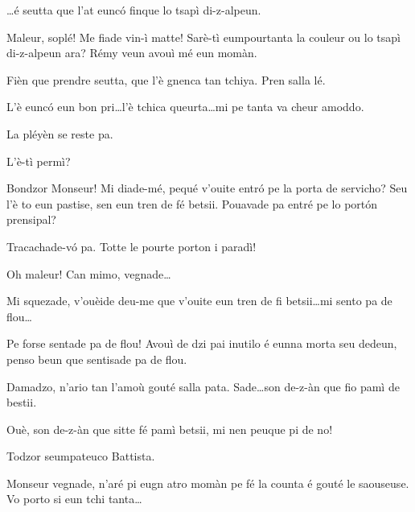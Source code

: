 \begin{drama}
\Battistaspeaks \ldots é seutta que l’at eunc\'o finque lo tsapì di-z-alpeun.

\Cesarspeaks{} Maleur, soplé! Me fiade vin-ì matte! Sarè-tì eumpourtanta la couleur ou lo tsapì di-z-alpeun ara? Rémy veun avouì mé eun momàn.


\Cesarspeaks{} Fièn que prendre seutta, que l'è gnenca tan tchiya. Pren salla lé.

\Remyspeaks  L'è eunc\'o eun bon pri\ldots l'è tchica queurta\ldots mi pe tanta va cheur amoddo.

\Battistaspeaks  La pléyèn se reste pa.




\Preyespeaks L’è-tì permì? 

\Cesarspeaks  Bondzor Monseur! Mi diade-mé, pequé v'ouite entr\'o pe la porta de servicho? Seu l'è to eun pastise, sen eun tren de fé betsii. Pouavade pa entré pe lo port\'on prensipal?

\Preyespeaks Tracachade-v\'o pa. Totte le pourte porton i paradì!

\Cesarspeaks{} Oh maleur! Can mimo, vegnade\ldots

\Preyespeaks{} Mi squezade, v'ouèide deu-me que v'ouite eun tren de fi betsii\ldots mi sento pa de flou\ldots

\Hermannspeaks{} Pe forse sentade pa de flou! Avouì de dzi pai inutilo é eunna morta seu dedeun, penso beun que sentisade pa de flou.

\Preyespeaks Damadzo, n’ario tan l'amoù gouté salla pata. Sade\ldots son de-z-àn que fio pamì de bestii.

\Battistaspeaks  Ouè, son de-z-àn que sitte fé pamì betsii, mi nen peuque pi de no! 


\Preyespeaks{} Todzor seumpateuco Battista.

\Cesarspeaks  Monseur vegnade, n’aré pi eugn atro momàn pe fé la counta é gouté le saouseuse. Vo porto si eun tchi tanta\ldots



\end{drama}
